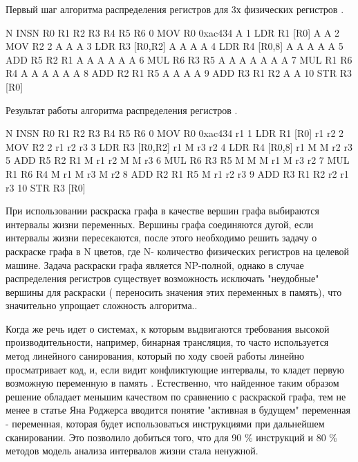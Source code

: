 \begin{ListingEnv}[!h]
\captiondelim{ } 
\caption{Первый шаг алгоритма распределения регистров для 3х физических регистров \cite{melnik2010case}.}\label{partReview:regalloc3}

\begin{Verb}
		N INSN              R0  R1  R2  R3  R4  R5  R6
		0 MOV R0 0xac434    A      
		1 LDR R1 [R0]       A   A
		2 MOV R2 2          A   A   A
		3 LDR R3 [R0,R2]    A   A   A   A
		4 LDR R4 [R0,8]     A   A   A   A   A
		5 ADD R5 R2 R1      A   A   A   A   A   A
		6 MUL R6 R3 R5      A   A   A   A   A   A   A
		7 MUL R1 R6 R4      A   A   A       A   A   A
		8 ADD R2 R1 R5      A   A   A           A
		9 ADD R3 R1 R2      A   A
		10 STR R3 [R0]     
	\end{Verb}
\end{ListingEnv}
\begin{ListingEnv}[!h]
\captiondelim{ } 
\caption{Результат работы алгоритма распределения регистров \cite{melnik2010case}.}\label{partReview:regalloc4}

\begin{Verb}
		N  INSN              R0  R1  R2  R3  R4  R5  R6
		0  MOV R0 0xac434    r1      
		1  LDR R1 [R0]       r1  r2
		2  MOV R2 2          r1  r2  r3
		3  LDR R3 [R0,R2]    r1  M   r3  r2
		4  LDR R4 [R0,8]     r1  M   M   r2  r3
		5  ADD R5 R2 R1      M   r1  r2  M   M   r3
		6  MUL R6 R3 R5      M   M   M   r1  M   r3  r2
		7  MUL R1 R6 R4      M   r1  M       r3  M   r2
		8  ADD R2 R1 R5      M   r1  r2          r3  
		9  ADD R3 R1 R2      r2  r1      r3  
		10 STR R3 [R0]     
	\end{Verb}
\end{ListingEnv}

При использовании раскраска графа в качестве вершин графа выбираются интервалы жизни переменных. Вершины графа соединяются дугой, если интервалы жизни пересекаются, после этого необходимо решить задачу о раскраске графа в N цветов, где N- количество физических регистров на целевой машине. Задача раскраски графа является NP-полной, однако в случае распределения регистров существует возможность исключать "неудобные" вершины для раскраски ( переносить значения этих переменных в память), что значительно упрощает сложность алгоритма.\cite{smith2004generalized, briggs1992register}. 

Когда же речь идет о системах, к которым выдвигаются требования высокой производительности, например, бинарная трансляция, то часто используется метод линейного санирования, который по ходу своей работы линейно просматривает код, и, если видит конфликтующие интервалы, то кладет первую возможную переменную в память \cite{poletto1999linear}. Естественно, что найденное таким образом решение обладает меньшим качеством по сравнению с раскраской графа, тем не менее в статье Яна Роджерса \cite{rogers2020efficient} вводится понятие "активная в будущем" переменная - переменная, которая будет использоваться инструкциями при дальнейшем сканировании. Это позволило добиться того, что для 90 \% инструкций и 80 \% методов модель анализа интервалов жизни стала ненужной. 


